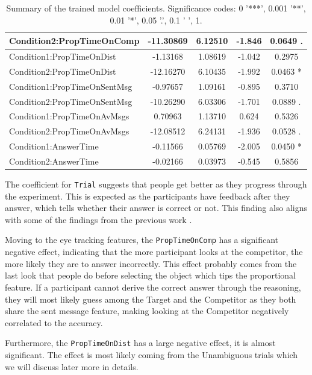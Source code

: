 \begin{table}[h!]
\begin{tabular}{|l|c|c|c|c|}
Condition2:PropTimeOnComp          & -11.30869 & 6.12510 & -1.846 & 0.0649 . \\ \hline
Condition1:PropTimeOnDist           & -1.13168 & 1.08619 & -1.042 & 0.2975 \\ \hline
Condition2:PropTimeOnDist          & -12.16270 & 6.10435 & -1.992 & 0.0463 * \\ \hline
Condition1:PropTimeOnSentMsg        & -0.97657 & 1.09161 & -0.895 & 0.3710 \\ \hline
Condition2:PropTimeOnSentMsg       & -10.26290 & 6.03306 & -1.701 & 0.0889 . \\ \hline
Condition1:PropTimeOnAvMsgs   & 0.70963 & 1.13710 & 0.624 & 0.5326 \\ \hline
Condition2:PropTimeOnAvMsgs & -12.08512 & 6.24131 & -1.936 & 0.0528 . \\ \hline
Condition1:AnswerTime               & -0.11566 & 0.05769 & -2.005 & 0.0450 * \\ \hline
Condition2:AnswerTime               & -0.02166 & 0.03973 & -0.545 & 0.5856 \\ \hline
\end{tabular}
\caption{Summary of the trained model coefficients. Significance codes: 0 '***', 0.001 '**', 0.01 '*', 0.05 '.', 0.1 ' ', 1.}
\label{tab:model_coefficients_acc}
\end{table}

The coefficient for \texttt{Trial} suggests that people get better as they progress through the experiment. This is expected as the participants have feedback after they answer, which tells whether their answer is correct or not. This finding also aligns with some of the findings from the previous work \cite{Mayn_2023, Mayn_2025}. 

Moving to the eye tracking features, the \texttt{PropTimeOnComp} has a significant negative effect, indicating that the more participant looks at the competitor, the more likely they are to answer incorrectly. This effect probably comes from the last look that people do before selecting the object which tips the proportional feature. If a participant cannot derive the correct answer through the reasoning, they will most likely guess among the Target and the Competitor as they both share the sent message feature, making looking at the Competitor negatively correlated to the accuracy.

Furthermore, the \texttt{PropTimeOnDist} has a large negative effect, it is almost significant. The effect is most likely coming from the Unambiguous trials which we will discuss later more in details. 

